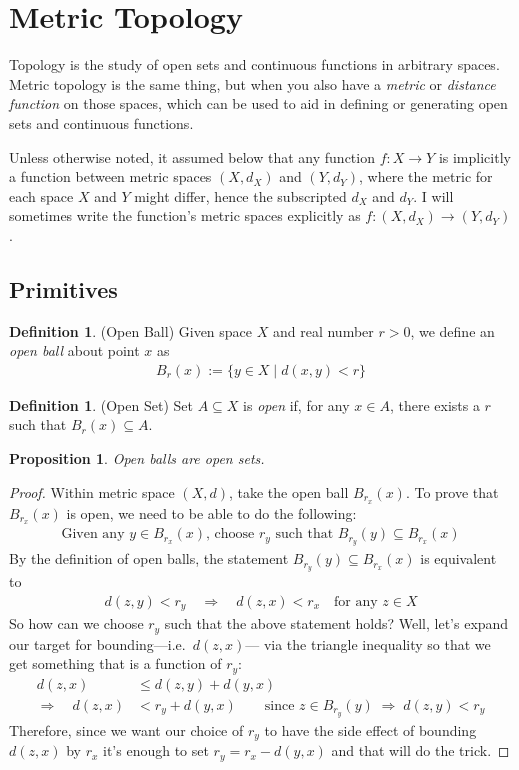 \documentclass[12pt]{article}
\theoremstyle{plain}
\newtheorem{prop}[thm]{Proposition}
\theoremstyle{definition}
\newtheorem{defn}[thm]{Definition}
\theoremstyle{remark}
\begin{document}
\section{Metric Topology}

Topology is the study of open sets and continuous functions in arbitrary
spaces. Metric topology is the same thing, but when you also have a
\emph{metric} or \emph{distance function} on those spaces, which can be
used to aid in defining or generating open sets and continuous
functions.

Unless otherwise noted, it assumed below that any function
$f:X\rightarrow Y$ is implicitly a function between metric spaces
$(X,d_X)$ and $(Y,d_Y)$, where the metric for each space $X$ and $Y$
might differ, hence the subscripted $d_X$ and $d_Y$.
I will sometimes write the function's metric spaces explicitly as
$f:(X,d_X)\rightarrow(Y,d_Y)$.

\subsection{Primitives}

\begin{defn}{(Open Ball)}
Given space $X$ and real number $r>0$, we define an \emph{open ball}
about point $x$ as
\begin{align*}
  B_r(x) := \{ y \in X \;|\; d(x,y)<r\}
\end{align*}
\end{defn}

\begin{defn}{(Open Set)}
Set $A\subseteq X$ is \emph{open} if, for any $x\in A$, there exists a
$r$ such that $B_r(x)\subseteq A$.
\end{defn}

\begin{prop}
Open balls are open sets.
\end{prop}
\begin{proof}
Within metric space $(X,d)$, take the open ball $B_{r_x}(x)$.  To prove
that $B_{r_x}(x)$ is open, we need to be able to do the following:
\begin{align*}
  \text{Given any $y\in B_{r_x}(x)$, choose $r_y$ such that $B_{r_y}(y)\subseteq B_{r_x}(x)$}
\end{align*}
By the definition of open balls, the statement $B_{r_y}(y)\subseteq
B_{r_x}(x)$ is equivalent to
\begin{align*}
  d(z,y) < r_y \quad\Rightarrow\quad
  d(z,x) < r_x
  \quad\text{for any $z\in X$}
\end{align*}
So how can we choose $r_y$ such that the above statement holds?
Well, let's expand our target for bounding---i.e.\ $d(z,x)$--- via the
triangle inequality so that we get something that is a function of
$r_y$:
\begin{align*}
  d(z,x) &\leq d(z,y) + d(y,x)\\
  \Rightarrow \quad
  d(z,x) &< r_y + d(y,x) \qquad
  \text{since $z\in B_{r_y}(y) \; \Rightarrow\; d(z,y)<r_y$}
\end{align*}
Therefore, since we want our choice of $r_y$ to have the side effect of
bounding $d(z,x)$ by $r_x$ it's enough to set $r_y = r_x - d(y,x)$ and
that will do the trick.
\end{proof}
\end{document}
